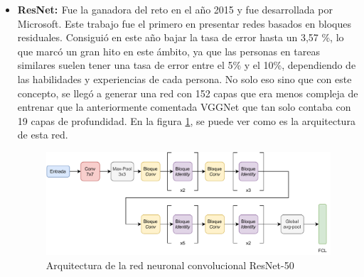 \begin{itemize}
    
    \item \textbf{ResNet: \cite{He2016}} Fue la ganadora del reto en el año 2015 y fue desarrollada por Microsoft. Este trabajo fue el primero en presentar redes basados en bloques residuales. Consiguió en este año bajar la tasa de error hasta un 3,57 \%, lo que marcó un gran hito en este ámbito, ya que las personas en tareas similares suelen tener una tasa de error entre el 5\% y el 10\%, dependiendo de las habilidades y experiencias de cada persona. No solo eso sino que con este concepto, se llegó a generar una red con 152 capas que era menos compleja de entrenar que la anteriormente comentada VGGNet que tan solo contaba con 19 capas de profundidad. En la figura \ref{fig:resnet}, se puede ver como es la arquitectura de esta red.
    
    \begin{figure}[!h]
        \centering
        \includegraphics[width=\textwidth]{figuras/desarrollo teorico/desarrollo_teorico-ResNet 50.pdf}
        \caption{Arquitectura de la red neuronal convolucional ResNet-50}
        \label{fig:resnet}
    \end{figure}
    

\end{itemize}
